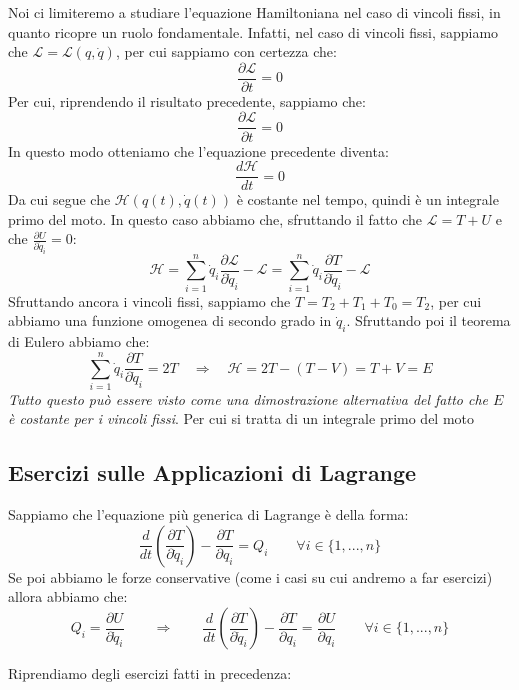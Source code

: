 \documentclass[11pt,a4paper,twoside]{article}
\theoremstyle{definition}
\begin{document}
Noi ci limiteremo a studiare l'equazione Hamiltoniana nel caso di vincoli fissi, in quanto ricopre un ruolo fondamentale. Infatti, nel caso di vincoli fissi, sappiamo che $\mathcal L = \mathcal L(q, \dot q)$, per cui sappiamo con certezza che:
\[ \frac{\partial \mathcal L}{\partial t} = 0 \]
Per cui, riprendendo il risultato precedente, sappiamo che:
\[ \frac{\partial \mathcal L}{\partial t}=0 \]
In questo modo otteniamo che l'equazione precedente diventa:
\[ \frac{d \mathcal H}{dt} = 0\]
Da cui segue che $\mathcal H(q(t), \dot q(t))$ è costante nel tempo, quindi è un integrale primo del moto. In questo caso abbiamo che, sfruttando il fatto che $\mathcal L = T+U$ e che $\frac{\partial U}{\partial \dot q_i}=0$:
\[ \mathcal H = \sum_{i=1}^n \dot q_i \frac{\partial \mathcal L}{\partial \dot q_i} - \mathcal L = \sum_{i=1}^n \dot q_i \frac{\partial T}{\partial \dot q_i} - \mathcal L \]
Sfruttando ancora i vincoli fissi, sappiamo che $T = T_2+ T_1 + T_0 = T_2$, per cui abbiamo una funzione omogenea di secondo grado in $\dot q_i$. Sfruttando poi il teorema di Eulero abbiamo che:
\[ \sum_{i = 1}^n \dot q_i \frac{\partial T}{\partial \dot q_i} = 2T \quad \Rightarrow \quad \mathcal H = 2T - (T-V) = T+V = E \]
\textit{Tutto questo può essere visto come una dimostrazione alternativa del fatto che $E$ è costante per i vincoli fissi}. Per cui si tratta di un integrale primo del moto

\subsection{Esercizi sulle Applicazioni di Lagrange}

Sappiamo che l'equazione più generica di Lagrange è della forma:
\[ \frac{d}{dt} \left( \frac{\partial T}{\partial \dot q_i} \right) - \frac{\partial T}{\partial q_i} = Q_i \qquad \forall i \in \{ 1,...,n \} \]
Se poi abbiamo le forze conservative (come i casi su cui andremo a far esercizi) allora abbiamo che:
\[ Q_i = \frac{\partial U}{\partial \dot q_i} \qquad \Rightarrow \qquad \frac{d}{dt} \left( \frac{\partial T}{\partial \dot q_i}\right) - \frac{\partial T}{\partial q_i} = \frac{\partial U}{\partial q_i} \qquad \forall i \in \{1,...,n\} \]

Riprendiamo degli esercizi fatti in precedenza:
\end{document}
